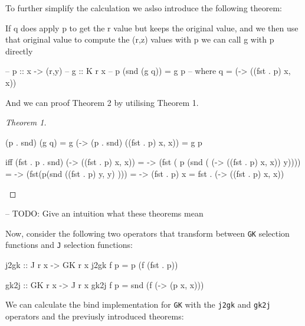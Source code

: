 \documentclass[runningheads]{llncs}
\begin{document}
To further simplify the calculation we aslso introduce the following
theorem:

\begin{theorem}[Theorem 2]
If q does apply p to get the r value but keeps the original value, and we then use that 
original value to compute the (r,z) values with p we can call g with p directly
\begin{haskell}

-- p :: x -> (r,y)
-- g :: K r x
-- p (snd (g q)) = g p
--    where q = (\x -> ((fst . p) x, x))
\end{haskell}
\end{theorem}

And we can proof Theorem 2 by utilising Theorem 1.

\begin{proof}[Theorem 1]
\begin{haskell}
(p . snd) (g q)
= g (\x -> (p . snd) ((fst . p) x, x))
= g p

iff 
(fst . p . snd) (\x -> ((fst . p) x, x))
= \y -> (fst ( p (snd ( (\x -> ((fst . p) x, x)) y))))
= \y -> (fst(p(snd ((fst . p) y, y) )))
= \x -> (fst . p) x
= fst . (\x -> ((fst . p) x, x)) 
\end{haskell}
\end{proof}

-- TODO: Give an intuition what these theorems mean

Now, consider the following two operators that transform between
\texttt{GK} selection functions and \texttt{J} selection functions:

\begin{code}
j2gk :: J r x -> GK r x
j2gk f p = p (f (fst . p))
\end{code}

\begin{code}
gk2j :: GK r x -> J r x
gk2j f p = snd (f (\x -> (p x, x)))
\end{code}

We can calculate the bind implementation for \texttt{GK} with the
\texttt{j2gk} and \texttt{gk2j} operators and the previusly introduced
theorems:
\end{document}

